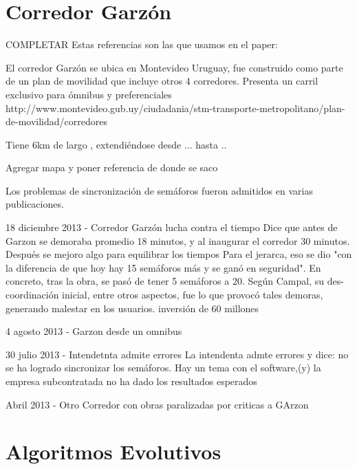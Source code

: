 \section{Corredor Garzón}
COMPLETAR
Estas referencias son las que usamos en el paper:
\citep{olivera2013}
\citep{ olivera2015}
	
	
El corredor Garzón se ubica en Montevideo Uruguay, fue construido como parte de un plan de movilidad que incluye otros 4 corredores. 
Presenta un carril exclusivo para ómnibus y preferenciales
http://www.montevideo.gub.uy/ciudadania/stm-transporte-metropolitano/plan-de-movilidad/corredores

Tiene 6km de largo , extendiéndose desde ...  hasta ..

Agregar mapa y poner referencia de donde se saco

Los problemas de sincronización de semáforos fueron admitidos en varias publicaciones.

18 diciembre 2013 - Corredor Garzón lucha contra el tiempo %
Dice que antes de Garzon se demoraba promedio 18 minutos, y al inaugurar el corredor 30 minutos. Después se mejoro algo para equilibrar los tiempos
Para el jerarca, eso se dio "con la diferencia de que hoy hay 15 semáforos más y se ganó en seguridad". En concreto, tras la obra, se pasó de tener 5 semáforos a 20. Según Campal, su des-coordinación inicial, entre otros aspectos, fue lo que provocó tales demoras, generando malestar en los usuarios.
inversión de 60 millones


4 agosto 2013 - Garzon desde un omnibus %


30 julio 2013  - Intendetnta admite errores %
La intendenta admte errores y dice: no se ha logrado sincronizar los semáforos. Hay un tema con el software,(y) la empresa subcontratada no ha dado los resultados esperados


Abril 2013 - Otro Corredor con obras paralizadas por criticas a GArzon




\section{Algoritmos Evolutivos}

